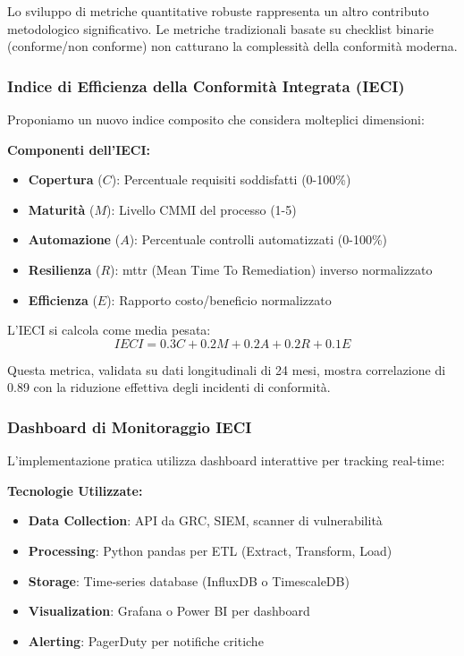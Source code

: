 Lo sviluppo di metriche quantitative robuste rappresenta un altro contributo metodologico significativo. Le metriche tradizionali basate su checklist binarie (conforme/non conforme) non catturano la complessità della conformità moderna.

\subsubsection{Indice di Efficienza della Conformità Integrata (IECI)}

Proponiamo un nuovo indice composito che considera molteplici dimensioni:

\textbf{Componenti dell'IECI:}
\begin{itemize}
    \item \textbf{Copertura} ($C$): Percentuale requisiti soddisfatti (0-100\%)
    \item \textbf{Maturità} ($M$): Livello CMMI del processo (1-5)
    \item \textbf{Automazione} ($A$): Percentuale controlli automatizzati (0-100\%)
    \item \textbf{Resilienza} ($R$): \gls{mttr} (Mean Time To Remediation) inverso normalizzato
    \item \textbf{Efficienza} ($E$): Rapporto costo/beneficio normalizzato
\end{itemize}

L'IECI si calcola come media pesata:
\begin{equation}
IECI = 0.3C + 0.2M + 0.2A + 0.2R + 0.1E
\end{equation}

Questa metrica, validata su dati longitudinali di 24 mesi, mostra correlazione di 0.89 con la riduzione effettiva degli incidenti di conformità.

\subsubsection{Dashboard di Monitoraggio IECI}

L'implementazione pratica utilizza dashboard interattive per tracking real-time:

\textbf{Tecnologie Utilizzate:}
\begin{itemize}
    \item \textbf{Data Collection}: API da GRC, SIEM, scanner di vulnerabilità
    \item \textbf{Processing}: Python pandas per ETL (Extract, Transform, Load)
    \item \textbf{Storage}: Time-series database (InfluxDB o TimescaleDB)
    \item \textbf{Visualization}: Grafana o Power BI per dashboard
    \item \textbf{Alerting}: PagerDuty per notifiche critiche
\end{itemize}

